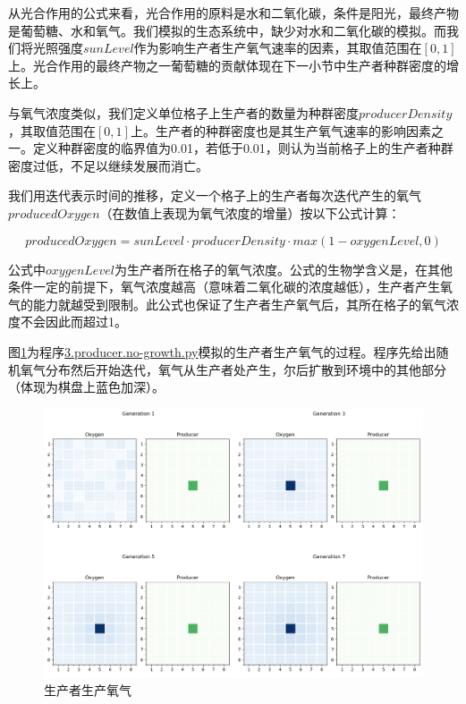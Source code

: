 \documentclass{ctexart}
\begin{document}
从光合作用的公式来看，光合作用的原料是水和二氧化碳，条件是阳光，最终产物是葡萄糖、水和氧气。我们模拟的生态系统中，缺少对水和二氧化碳的模拟。而我们将光照强度$sunLevel$作为影响生产者生产氧气速率的因素，其取值范围在$[0, 1]$上。光合作用的最终产物之一葡萄糖的贡献体现在下一小节中生产者种群密度的增长上。

与氧气浓度类似，我们定义单位格子上生产者的数量为种群密度$producerDensity$，其取值范围在$[0, 1]$上。生产者的种群密度也是其生产氧气速率的影响因素之一。定义种群密度的临界值为0.01，若低于0.01，则认为当前格子上的生产者种群密度过低，不足以继续发展而消亡。

我们用迭代表示时间的推移，定义一个格子上的生产者每次迭代产生的氧气$producedOxygen$（在数值上表现为氧气浓度的增量）按以下公式计算：

\begin{equation}
  producedOxygen = sunLevel \cdot producerDensity \cdot max(1 - oxygenLevel, 0)
\end{equation}

公式中$oxygenLevel$为生产者所在格子的氧气浓度。公式的生物学含义是，在其他条件一定的前提下，氧气浓度越高（意味着二氧化碳的浓度越低），生产者产生氧气的能力就越受到限制。此公式也保证了生产者生产氧气后，其所在格子的氧气浓度不会因此而超过1。

图\ref{fig:producer-produce}为程序\underline{3.producer.no-growth.py}模拟的生产者生产氧气的过程。程序先给出随机氧气分布然后开始迭代，氧气从生产者处产生，尔后扩散到环境中的其他部分（体现为棋盘上蓝色加深）。

\begin{figure}[ht]
  \centering
  \includegraphics[width=\textwidth]{producer-produce.png}
  \caption{生产者生产氧气}
  \label{fig:producer-produce}
\end{figure}
\end{document}
